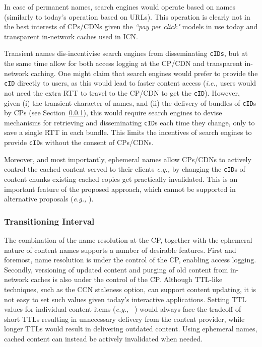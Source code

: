 \documentclass{sig-alternate}
\newcommand{\ie}{{\em i.e.,\/ }}
\newcommand{\eg}{{\em e.g.,\/ }}
\begin{document}
In case of permanent names, search engines would operate based on names (similarly to today's operation based on URLs). This operation is clearly not in the best interests of CPs/CDNs given the \textit{``pay per click"} models in use today and transparent in-network caches used in ICN. 

Transient names dis-incentivise search engines from disseminating \texttt{cIDs}, but at the same time allow for both access logging at the CP/CDN and transparent in-network caching. One might claim that search engines would prefer to provide the \texttt{cID} directly to users, as this would lead to faster content access (\ie users would not need the extra RTT to travel to the CP/CDN to get the \texttt{cID}). However, given (i) the transient character of names, and (ii) the delivery of bundles of \texttt{cID}s by CPs (see Section~\ref{transitioning-interval}), this would require search engines to devise mechanisms for retrieving and disseminating \texttt{cID}s each time they change, only to save a single RTT in each bundle. This limits the incentives of search engines to provide \texttt{cID}s without the consent of CPs/CDNs.

Moreover, and most importantly, ephemeral names allow CPs/CDNs to actively control the cached content served to their clients  \eg by changing the \texttt{cID}s of content chunks existing cached copies get practically invalidated. This is an important feature of the proposed approach, which cannot be supported in alternative proposals (\eg \cite{ccn,netinf,conet}).









\subsubsection{Transitioning Interval}\label{transitioning-interval}

The combination of the name resolution at the CP, together with the ephemeral nature of content names supports a number of desirable features. First and foremost, name resolution is under the control of the CP, enabling access logging. Secondly, versioning of updated content and purging of old content from in-network caches is also under the control of the CP. 
Although TTL-like techniques, such as the CCN staleness option, can support content updating, it is not easy to set such values given today's interactive applications. Setting TTL values for individual content items (\eg~\cite{netifncachecontrol}) would always face the tradeoff of short TTLs resulting in unnecessary delivery from the content provider, while longer TTLs would result in delivering outdated content. Using ephemeral names, cached content can instead be actively invalidated when needed. 
\end{document}
